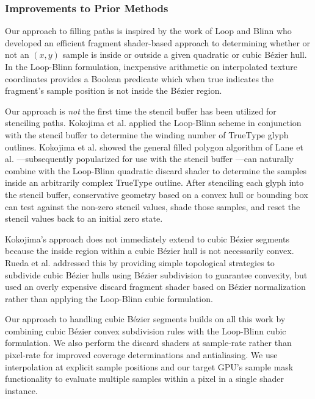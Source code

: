 \subsubsection{Improvements to Prior Methods}

Our approach to filling paths is inspired by the work of Loop and Blinn
 who developed an efficient fragment
shader-based approach to determining whether or not an $(x,y)$ sample is
inside or outside a given quadratic or cubic B\'{e}zier hull.  In the
Loop-Blinn formulation, inexpensive arithmetic on interpolated texture
coordinates provides a Boolean predicate which when true indicates the
fragment's sample position is not inside the B\'{e}zier region.

Our approach is {\em not} the first time the stencil buffer has been utilized
for stenciling paths.  Kokojima et al.  applied
the Loop-Blinn scheme in conjunction with the stencil buffer to
determine the winding number of TrueType glyph outlines.  Kokojima
et al. showed the general filled polygon algorithm of Lane et
al. ---subsequently popularized for
use with the stencil buffer \cite{RedBook}---can naturally combine with
the Loop-Blinn quadratic discard shader to determine the samples inside
an arbitrarily complex TrueType outline.  After stenciling each glyph
into the stencil buffer, conservative geometry based on a convex hull or
bounding box can test against the non-zero stencil values, shade those
samples, and reset the stencil values back to an initial zero state.

Kokojima's approach does not immediately extend to cubic B\'{e}zier
segments because the inside region within a cubic B\'{e}zier hull is not
necessarily convex.  Rueda et al. 
addressed this by providing simple topological strategies to subdivide
cubic B\'{e}zier hulls using B\'{e}zier subdivision to guarantee
convexity, but used an overly expensive discard fragment shader based
on B\'{e}zier normalization rather than applying the Loop-Blinn cubic
formulation.

Our approach to handling cubic B\'{e}zier segments builds on all this
work by combining cubic B\'{e}zier convex subdivision rules with the
Loop-Blinn cubic formulation.  We also perform the discard shaders at
sample-rate rather than pixel-rate for improved coverage determinations
and antialiasing. We use interpolation at explicit sample positions and
our target GPU's sample mask functionality to evaluate multiple samples
within a pixel in a single shader instance.

